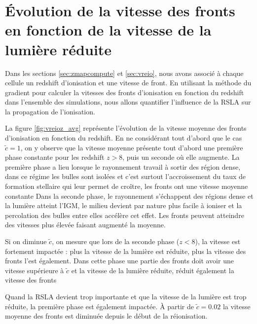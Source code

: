 \section{Évolution de la vitesse des fronts en fonction de la vitesse de la lumière réduite}
\label{sec:compfrontspeep}

Dans les sections \ref{sec:zmapcompute} et \ref{sec:vreio}, nous avons associé à chaque cellule un redshift d'ionisation et une vitesse de front.
En utilisant la méthode du gradient pour calculer la vitesses des fronts d'ionisation en fonction du redshift dans l'ensemble des simulations, nous allons quantifier l'influence de la \ac{RSLA} sur la propagation de l'ionisation.


La figure \ref{fig:vreioz_avg} représente l'évolution de la vitesse moyenne des fronts d'ionisation en fonction du redshift.
En ne considérant tout d'abord que le cas  $\tilde{c}=1$, on y observe que la vitesse moyenne présente tout d'abord une première phase constante pour les redshift $z>8$, puis un seconde où elle augmente.
La première phase a lieu lorsque le rayonnement travail à sortir des région dense, dans ce régime les bulles sont isolées et c'est surtout l'accroissement du taux de formation stellaire qui leur permet de croître, les fronts ont une vitesse moyenne constante
Dans la seconde phase, le rayonnement s'échappent des régions dense et la lumière atteint l'\ac{IGM}, le milieu devient par nature plus facile à ioniser et la percolation des bulles entre elles accélère cet effet.
Les fronts peuvent atteindre des vitesses plus élevée faisant augmenté la moyenne.

Si on diminue $\tilde{c}$, on mesure que lors de la seconde phase ($z<8$), la vitesse est fortement impactée : plus la vitesse de la lumière est réduite, plus la vitesse des fronts l'est également.
Dans cette phase une partie des fronts doit avoir une vitesse supérieure à $\tilde{c}$ et la vitesse de la lumière réduite, réduit également la vitesse des fronts

Quand la \ac{RSLA} devient trop importante et que la vitesse de la lumière est trop réduite, la première phase est également impactée.
À partir de $\tilde{c}=0.02$ la vitesse moyenne des fronts est diminuée depuis le début de la réionisation.

